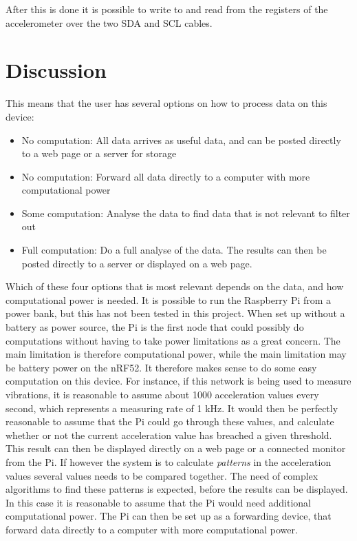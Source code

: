 After this is done it is possible to write to and read from the registers of the accelerometer over the two SDA and SCL cables. 




\section{Discussion}

This means that the user has several options on how to process data on this device: 

\begin{itemize}
  \item No computation: All data arrives as useful data, and can be posted directly to a web page or a server for storage
  \item No computation: Forward all data directly to a computer with more computational power
  \item Some computation: Analyse the data to find data that is not relevant to filter out
  \item Full computation: Do a full analyse of the data. The results can then be posted directly to a server or displayed on a web page. 
\end{itemize}

Which of these four options that is most relevant depends on the data, and how computational power is needed. It is possible to run the Raspberry Pi from a power bank, but this has not been tested in this project. When set up without a battery as power source, the Pi is the first node that could possibly do computations without having to take power limitations as a great concern. The main limitation is therefore computational power, while the main limitation may be battery power on the nRF52. It therefore makes sense to do some easy computation on this device. For instance, if this network is being used to measure vibrations, it is reasonable to assume about 1000 acceleration values every second, which represents a measuring rate of 1 kHz. It would then be perfectly reasonable to assume that the Pi could go through these values, and calculate whether or not the current acceleration value has breached a given threshold. This result can then be displayed directly on a web page or a connected monitor from the Pi. If however the system is to calculate \textit{patterns} in the acceleration values several values needs to be compared together. The need of complex algorithms to find these patterns is expected, before the results can be displayed. In this case it is reasonable to assume that the Pi would need additional computational power. The Pi can then be set up as a forwarding device, that forward data directly to a computer with more computational power. 


